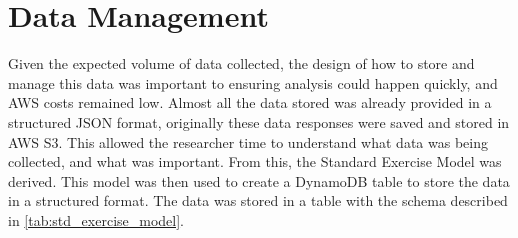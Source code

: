 \section{Data Management}
Given the expected volume of data collected, the design of how to store and manage this data was important to ensuring analysis could happen quickly, and AWS costs remained low. Almost all the data stored was already provided in a structured JSON format, originally these data responses were saved and stored in AWS S3. This allowed the researcher time to understand what data was being collected, and what was important. From this, the Standard Exercise Model was derived. This model was then used to create a DynamoDB table to store the data in a structured format. The data was stored in a table with the schema described in \autoref{tab:std_exercise_model}.
\begin{table}[h]
  \centering
  \caption[Standard Exercise Model Schema]{\label{tab:std_exercise_model}The schema for the "Standard Exercise Model"}
\end{table}

